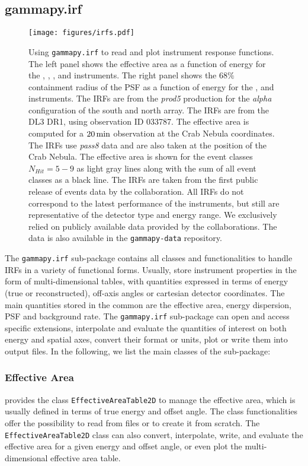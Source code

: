 \documentclass[longauth]{aa}
\newcommand{\code}[1]{\texttt{#1}}
\begin{document}
\subsection{gammapy.irf}
\label{ssec:gammapy-irf}
%
%
\begin{figure*}[t]
	\centering
	\texttt{[image: figures/irfs.pdf]}
	\caption{
		Using \code{gammapy.irf} to read and plot instrument response functions.
		The left panel shows the effective area as a function of energy for
		the \cta, \hess, \magic, \hawc and \fermi instruments. The right panel shows
		the $68\%$ containment radius of the PSF as a function of energy for the \cta, \hess
		and \fermi instruments. The \cta IRFs are from the \textit{prod5} production for the {\it alpha} configuration of the south and north array. The \hess IRFs are from the DL3 DR1,
        using observation ID 033787. The \magic effective area is computed for a
        $20\,{\rm min}$ observation at the Crab Nebula coordinates. The
		\fermi IRFs use \textit{pass8} data and are also taken at the position of the Crab Nebula.
		The \hawc effective area is shown for the event classes $N_{Hit}=5 - 9$ as light gray
		lines along with the sum of all event classes as a black line. The \hawc IRFs are taken from
		the first public release of events data by the \hawc collaboration. All IRFs do not correspond
		to the latest performance of the instruments, but still are representative of the 
		detector type and energy range. We exclusively relied on publicly available
		data provided by the collaborations. The data is also available in the
		\code{gammapy-data} repository.
    }
	\label{fig:irfs}
\end{figure*}
%

The \code{gammapy.irf} sub-package contains all classes and functionalities
to handle IRFs in a variety of functional forms.
Usually, \irfs store instrument properties in the form of multi-dimensional
tables, with quantities expressed in terms of energy (true or reconstructed),
off-axis angles or cartesian detector coordinates. The main quantities stored in
the common \gammaray \irfs are the effective area, energy dispersion,
PSF and background rate. The \code{gammapy.irf}
sub-package can open and access specific \irf extensions,
interpolate and evaluate the quantities of interest on both energy and spatial
axes, convert their format or units, plot or write them into
output files. In the following, we list the main classes of the
sub-package:

\subsubsection{Effective Area}
\gammapy provides the class \code{EffectiveAreaTable2D} to
manage the effective area, which is usually defined in terms of true energy and offset angle.
The class functionalities offer the possibility to read from files or to create
it from scratch. The \code{EffectiveAreaTable2D} class can also convert, interpolate,
write, and evaluate the effective area for a given energy and offset angle, or
even plot the multi-dimensional effective area table.
\end{document}
